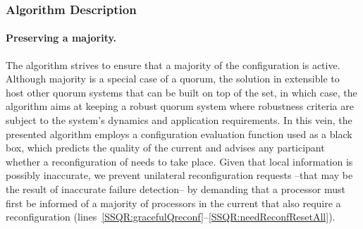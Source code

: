 \documentclass[11pt]{article}
\newcommand{\remove}[1]{}
\newtheorem{theorem}{Theorem}[section]
\newtheorem{lemma}[theorem]{Lemma}
\begin{document}
\remove{
\begin{lemma}[Lemma~\ref{thQ:triggeredWhenNeeded}]
Starting from an  execution, Algorithm~\ref{alg:SSQR} guarantees that (1) if a majority of  members collapse or (2) if a majority of members require a reconfiguration as per the prediction function, a reconfiguration takes place.\vspace{-.5em}
\end{lemma}

\begin{lemma}[Lemma~\ref{thQ:triggersControlled}]
Starting from an  execution, any call to   (lines~\ref{SSQR:noMajTrigger} and~\ref{SSQR:needReconfTrigger}) related to a specific event (majority collapse or agreement of majority to change ), can only cause a one per participant trigger. After the  has been established, no triggering that relate to this event take place.\vspace{-.5em}
\end{lemma}


\begin{theorem}[\textbf{Theorem~\ref{thQ:corrUpperApp}}]
\label{thQ:corrUpper}
Let  be an execution of Algorithm~\ref{alg:SSQR} starting from an arbitrary system state.  has a suffix in which is a legal execution.\vspace{-1em}
\end{theorem}
}






\subsubsection{Algorithm Description}
\paragraph{Preserving a majority.}
The algorithm strives to ensure that a majority of the configuration is active. Although majority is a special case of a quorum, the solution in extensible to host other quorum systems that can be built on top of the  set, in which case, the algorithm aims at keeping a robust quorum system where robustness criteria are subject to the system's dynamics and application requirements. 
In this vein, the presented algorithm employs a configuration evaluation function  used as a black box, which predicts the quality of the current  and advises any participant whether a reconfiguration of  needs to take place.
Given that local information is possibly inaccurate, we prevent unilateral reconfiguration requests --that may be the result of inaccurate failure detection-- by demanding that a processor must first be informed of a majority of processors in the current  that also require a reconfiguration (lines~\ref{SSQR:gracefulQreconf}--\ref{SSQR:needReconfResetAll}). 
\end{document}
